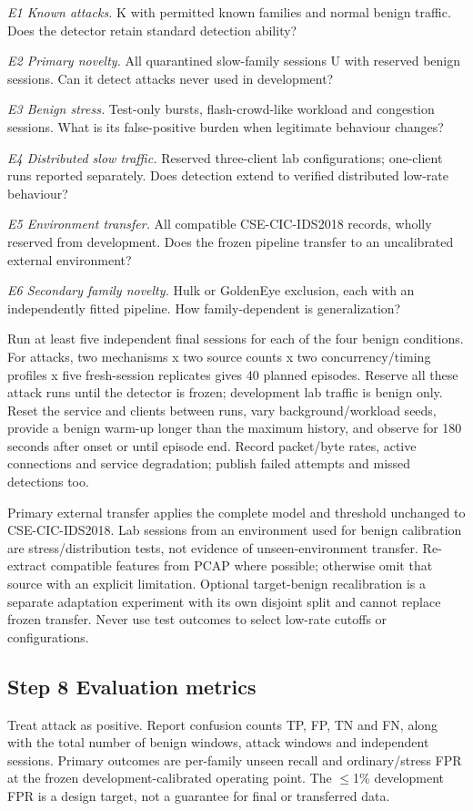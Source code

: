 \documentclass[conference]{IEEEtran}
\begin{document}
\noindent\textit{E1 Known attacks.} K with permitted known families and normal benign traffic. Does the detector retain standard detection ability?

\noindent\textit{E2 Primary novelty.} All quarantined slow-family sessions U with reserved benign sessions. Can it detect attacks never used in development?

\noindent\textit{E3 Benign stress.} Test-only bursts, flash-crowd-like workload and congestion sessions. What is its false-positive burden when legitimate behaviour changes?

\noindent\textit{E4 Distributed slow traffic.} Reserved three-client lab configurations; one-client runs reported separately. Does detection extend to verified distributed low-rate behaviour?

\noindent\textit{E5 Environment transfer.} All compatible CSE-CIC-IDS2018 records, wholly reserved from development. Does the frozen pipeline transfer to an uncalibrated external environment?

\noindent\textit{E6 Secondary family novelty.} Hulk or GoldenEye exclusion, each with an independently fitted pipeline. How family-dependent is generalization?

Run at least five independent final sessions for each of the four benign conditions. For attacks, two mechanisms x two source counts x two concurrency/timing profiles x five fresh-session replicates gives 40 planned episodes. Reserve all these attack runs until the detector is frozen; development lab traffic is benign only. Reset the service and clients between runs, vary background/workload seeds, provide a benign warm-up longer than the maximum history, and observe for 180 seconds after onset or until episode end. Record packet/byte rates, active connections and service degradation; publish failed attempts and missed detections too.

Primary external transfer applies the complete model and threshold unchanged to CSE-CIC-IDS2018. Lab sessions from an environment used for benign calibration are stress/distribution tests, not evidence of unseen-environment transfer. Re-extract compatible features from PCAP where possible; otherwise omit that source with an explicit limitation. Optional target-benign recalibration is a separate adaptation experiment with its own disjoint split and cannot replace frozen transfer. Never use test outcomes to select low-rate cutoffs or configurations.

\subsection{Step 8 Evaluation metrics}
Treat attack as positive. Report confusion counts TP, FP, TN and FN, along with the total number of benign windows, attack windows and independent sessions. Primary outcomes are per-family unseen recall and ordinary/stress FPR at the frozen development-calibrated operating point. The $\leq$1\% development FPR is a design target, not a guarantee for final or transferred data.
\end{document}
